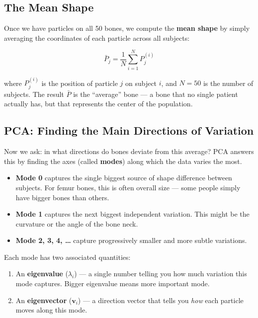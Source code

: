 \documentclass[12pt,a4paper]{article}
\begin{document}
\subsection{The Mean Shape}

Once we have particles on all 50 bones, we compute the \textbf{mean shape} by simply averaging the coordinates of each particle across all subjects:

\[
\bar{P}_j = \frac{1}{N}\sum_{i=1}^{N} P_j^{(i)}
\]

where $P_j^{(i)}$ is the position of particle $j$ on subject $i$, and $N = 50$ is the number of subjects. The result $\bar{P}$ is the ``average'' bone --- a bone that no single patient actually has, but that represents the center of the population.

\subsection{PCA: Finding the Main Directions of Variation}

Now we ask: in what directions do bones deviate from this average? PCA answers this by finding the axes (called \textbf{modes}) along which the data varies the most.

\begin{itemize}[itemsep=0.5em]
    \item \textbf{Mode 0} captures the single biggest source of shape difference between subjects. For femur bones, this is often overall size --- some people simply have bigger bones than others.
    \item \textbf{Mode 1} captures the next biggest independent variation. This might be the curvature or the angle of the bone neck.
    \item \textbf{Mode 2, 3, 4, \ldots} capture progressively smaller and more subtle variations.
\end{itemize}

Each mode has two associated quantities:
\begin{enumerate}
    \item An \textbf{eigenvalue} ($\lambda_i$) --- a single number telling you how much variation this mode captures. Bigger eigenvalue means more important mode.
    \item An \textbf{eigenvector} ($\mathbf{v}_i$) --- a direction vector that tells you \emph{how} each particle moves along this mode.
\end{enumerate}
\end{document}
